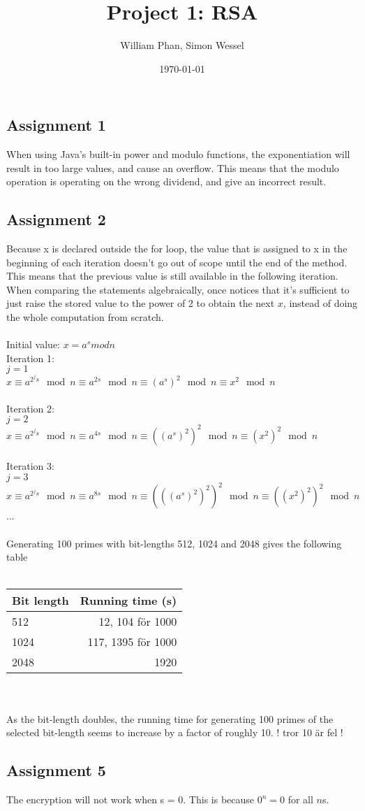 \documentclass[11pt,a4paper]{article}
\title{Project 1: RSA} %
\author{William Phan, Simon Wessel}
\date{\today} %
\begin{document}
\maketitle %

\setcounter{secnumdepth}{0}

\subsection{Assignment 1}
When using Java's built-in power and modulo functions, the exponentiation will result in too large values, and cause an overflow. This means that the modulo operation is operating on the wrong dividend, and give an incorrect result.

\subsection{Assignment 2}
Because x is declared outside the for loop, the value that is assigned to x in the beginning of each iteration doesn't go out of scope until the end of the method. This means that the previous value is still available in the following iteration. When comparing the statements algebraically, once notices that it's sufficient to just raise the stored value to the power of 2 to obtain the next $x$, instead of doing the whole computation from scratch.
\\\\
Initial value: $x = a^s mod n$ \\
Iteration 1: \\
$j = 1$ \\
$x \equiv a^{ 2^j s } \mod n \equiv a^{ 2s } \mod n \equiv (a^s)^2 \mod n \equiv x^2 \mod n$ \\\\
Iteration 2: \\
$j = 2$ \\
$x \equiv a^{ 2^j s } \mod n \equiv a^{ 4s } \mod n \equiv ((a^s)^2)^2 \mod n \equiv (x^2)^2 \mod n$ \\\\
Iteration 3: \\
$j = 3$ \\
$x \equiv a^{ 2^j s } \mod n \equiv a^{ 8s } \mod n \equiv (((a^s)^2)^2)^2 \mod n \equiv ((x^2)^2)^2 \mod n$ \\
...
\\\\
Generating 100 primes with bit-lengths 512, 1024 and 2048 gives the following table \\\\
\begin{tabular}{ l | r }
	Bit length & Running time (s)\\ \hline
	512 & 12, 104 för 1000 \\
	1024 & 117, 1395 för 1000 \\
	2048 & 1920 \\
\end{tabular}
\\\\
As the bit-length doubles, the running time for generating 100 primes of the selected bit-length seems to increase by a factor of roughly 10. ! tror 10 är fel !

\subsection{Assignment 5}

The encryption will not work when s = 0. This is because $0^n = 0$ for all $n$s.
\end{document}
